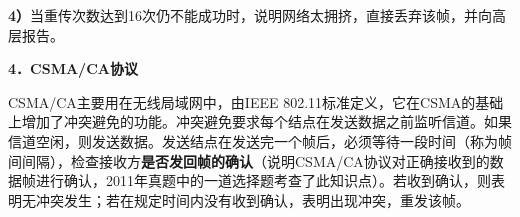 \textbf{4）}当重传次数达到16次仍不能成功时，说明网络太拥挤，直接丢弃该帧，并向高层报告。

\textbf{{4．CSMA/CA协议}}

CSMA/CA主要用在无线局域网中，由IEEE
802.11标准定义，它在CSMA的基础上增加了冲突避免的功能。冲突避免要求每个结点在发送数据之前监听信道。如果信道空闲，则发送数据。发送结点在发送完一个帧后，必须等待一段时间（称为帧间间隔），检查接收方\textbf{是否发回帧的确认}（说明CSMA/CA协议对正确接收到的数据帧进行确认，2011年真题中的一道选择题考查了此知识点）。若收到确认，则表明无冲突发生；若在规定时间内没有收到确认，表明出现冲突，重发该帧。
